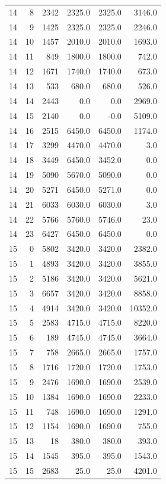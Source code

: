 \begin{longtable}{rrrrrr}
14 & 8 & 2342 & 2325.0 & 2325.0 & 3146.0\\
14 & 9 & 1425 & 2325.0 & 2325.0 & 2246.0\\
14 & 10 & 1457 & 2010.0 & 2010.0 & 1693.0\\
14 & 11 & 849 & 1800.0 & 1800.0 & 742.0\\
14 & 12 & 1671 & 1740.0 & 1740.0 & 673.0\\
14 & 13 & 533 & 680.0 & 680.0 & 526.0\\
14 & 14 & 2443 & 0.0 & 0.0 & 2969.0\\
14 & 15 & 2140 & 0.0 & -0.0 & 5109.0\\
14 & 16 & 2515 & 6450.0 & 6450.0 & 1174.0\\
14 & 17 & 3299 & 4470.0 & 4470.0 & 3.0\\
14 & 18 & 3449 & 6450.0 & 3452.0 & 0.0\\
14 & 19 & 5090 & 5670.0 & 5090.0 & 0.0\\
14 & 20 & 5271 & 6450.0 & 5271.0 & 0.0\\
14 & 21 & 6033 & 6030.0 & 6030.0 & 3.0\\
14 & 22 & 5766 & 5760.0 & 5746.0 & 23.0\\
14 & 23 & 6427 & 6450.0 & 6450.0 & 0.0\\
15 & 0 & 5802 & 3420.0 & 3420.0 & 2382.0\\
15 & 1 & 4893 & 3420.0 & 3420.0 & 3855.0\\
15 & 2 & 5186 & 3420.0 & 3420.0 & 5621.0\\
15 & 3 & 6657 & 3420.0 & 3420.0 & 8858.0\\
15 & 4 & 4914 & 3420.0 & 3420.0 & 10352.0\\
15 & 5 & 2583 & 4715.0 & 4715.0 & 8220.0\\
15 & 6 & 189 & 4745.0 & 4745.0 & 3664.0\\
15 & 7 & 758 & 2665.0 & 2665.0 & 1757.0\\
15 & 8 & 1716 & 1720.0 & 1720.0 & 1753.0\\
15 & 9 & 2476 & 1690.0 & 1690.0 & 2539.0\\
15 & 10 & 1384 & 1690.0 & 1690.0 & 2233.0\\
15 & 11 & 748 & 1690.0 & 1690.0 & 1291.0\\
15 & 12 & 1154 & 1690.0 & 1690.0 & 755.0\\
15 & 13 & 18 & 380.0 & 380.0 & 393.0\\
15 & 14 & 1545 & 395.0 & 395.0 & 1543.0\\
15 & 15 & 2683 & 25.0 & 25.0 & 4201.0\\

\end{longtable}
